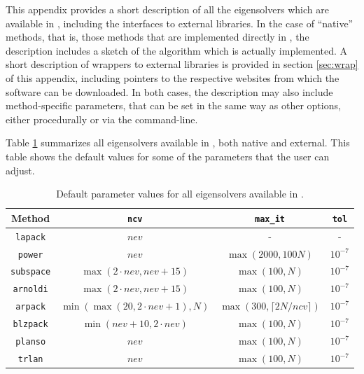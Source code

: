 	This appendix provides a short description of all the eigensolvers which are available in \slepc, including the interfaces to external libraries. In the case of ``native'' methods, that is, those methods that are implemented directly in \slepc, the description includes a sketch of the algorithm which is actually implemented. A short description of wrappers to external libraries is provided in section \ref{sec:wrap} of this appendix, including pointers to the respective websites from which the software can be downloaded. In both cases, the description may also include method-specific parameters, that can be set in the same way as other \slepc options, either procedurally or via the command-line.

	Table \ref{tab:defaults} summarizes all eigensolvers available in \slepc, both native and external. This table shows the default values for some of the parameters that the user can adjust.
\begin{table}
\centering
\begin{tabular}{cccc} \hline
Method   & \texttt{ncv} & \texttt{max\_it} & \texttt{tol} \\ \hline
\texttt{lapack}   &  $nev$ &         -         &    -      \\ 
\texttt{power}    &  $nev$ & $\max(2000,100N)$ & $10^{-7}$ \\ 
\texttt{subspace} &  $\max(2\cdot nev,nev+15)$ & $\max(100,N)$ & $10^{-7}$ \\ 
\texttt{arnoldi}  &  $\max(2\cdot nev,nev+15)$ & $\max(100,N)$ & $10^{-7}$ \\ 
\hline
\texttt{arpack}   &  $\min(\max(20,2\!\cdot\!nev\!+\!\!1),N)$ & $\max(300,\lceil 2N/ncv\rceil)$ & $10^{-7}$ \\ 
\texttt{blzpack}  &  $\min(nev\!+\!\!10,2\!\cdot\!nev)$ & $\max(100,N)$ & $10^{-7}$ \\ 
\texttt{planso}   &  $nev$ & $\max(100,N)$ & $10^{-7}$ \\ 
\texttt{trlan}    &  $nev$ & $\max(100,N)$ & $10^{-7}$ \\ \hline
\end{tabular}
\caption{\label{tab:defaults}Default parameter values for all eigensolvers available in \slepc.}
\end{table}

